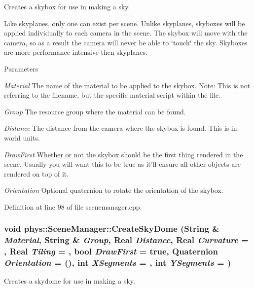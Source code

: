 Creates a skybox for use in making a sky. 

Like skyplanes, only one can exist per scene. Unlike skyplanes, skyboxes will be applied individually to each camera in the scene. The skybox will move with the camera, so as a result the camera will never be able to \char`\"{}touch\char`\"{} the sky. Skyboxes are more performance intensive then skyplanes. 
\begin{DoxyParams}{Parameters}
\item[{\em Material}]The name of the material to be applied to the skybox. Note: This is not referring to the filename, but the specific material script within the file. \item[{\em Group}]The resource group where the material can be found. \item[{\em Distance}]The distance from the camera where the skybox is found. This is in world units. \item[{\em DrawFirst}]Whether or not the skybox should be the first thing rendered in the scene. Usually you will want this to be true as it'll ensure all other objects are rendered on top of it. \item[{\em Orientation}]Optional quaternion to rotate the orientation of the skybox. \end{DoxyParams}


Definition at line 98 of file scenemanager.cpp.

\hypertarget{classphys_1_1SceneManager_abdcafee65bedf3c268759553b91a7c6b}{
\subsubsection[{CreateSkyDome}]{\setlength{\rightskip}{0pt plus 5cm}void phys::SceneManager::CreateSkyDome ({\bf String} \& {\em Material}, \/  {\bf String} \& {\em Group}, \/  {\bf Real} {\em Distance}, \/  {\bf Real} {\em Curvature} = {}, \/  {\bf Real} {\em Tiling} = {}, \/  bool {\em DrawFirst} = {\ttfamily true}, \/  {\bf Quaternion} {\em Orientation} = {()}, \/  int {\em XSegments} = {}, \/  int {\em YSegments} = {})}}
\label{dd/da8/classphys_1_1SceneManager_abdcafee65bedf3c268759553b91a7c6b}


Creates a skydome for use in making a sky. 

